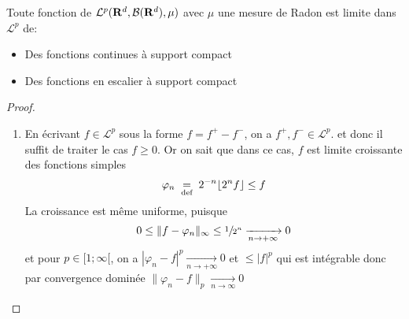 
\begin{cor}
    Toute fonction de $\mathcal  L^p(\mathbf R^d, \mathcal  B(\mathbf R^d), \mu)$ avec $\mu$ une mesure de Radon est limite dans  $ \mathcal  L^p$ de: \begin{itemize}
        \item Des fonctions continues à support compact
        \item Des fonctions en escalier à support compact
    \end{itemize}
\end{cor}

\begin{proof}
\begin{enumerate}
    \item En écrivant $f\in \mathcal L^p$ sous la forme $f=f^+-f^-$, on a $f^+,f^-\in \mathcal L^p$. et donc il suffit de traiter le cas $f\geq 0$.
        Or on sait que dans ce cas, $f$ est limite croissante des fonctions simples \[\varphi_n\;\underset{\text{def}}=\; 2^{-n}\lfloor 2^nf\rfloor  \leq f\]
        La croissance est même uniforme, puisque \[0\leq \|f-\varphi_n\|_{\infty}\leq  \sfrac{1}{2^n} \xrightarrow[n\to+\infty]{} 0\]
et pour $p\in [1;\infty[$, on a $|\varphi_n-f|^p \xrightarrow[n\to+\infty]{} 0$ et $\leq |f|^p$ qui est intégrable
donc par convergence dominée $\|\varphi_n-f\|_p \xrightarrow[n\to\infty]{} 0$
\end{enumerate}
\end{proof}


